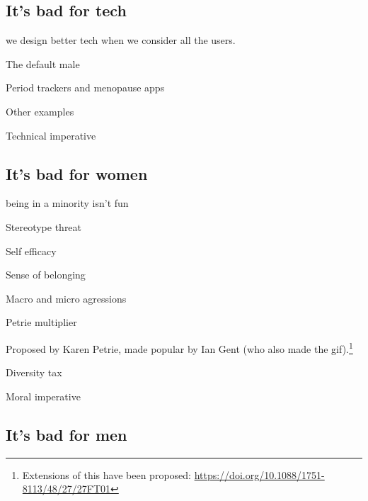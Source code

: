 \documentclass[xcolor=table]{beamer}
\begin{document}
\subsection{It's bad for tech}
\begin{frame}{we design better tech when we consider all the users. }

\end{frame}
\begin{frame}{The default male}
\end{frame}
\begin{frame}{Period trackers and menopause apps}
\end{frame}
\begin{frame}{Other examples}
\end{frame}
\begin{frame}{Technical imperative}
\end{frame}

\subsection{It's bad for women}
\begin{frame}{being in a minority isn't fun }

\end{frame}
\begin{frame}{Stereotype threat}
\end{frame}
\begin{frame}{Self efficacy}
\end{frame}
\begin{frame}{Sense of belonging }
\end{frame}
\begin{frame}{Macro and micro agressions}
\end{frame}
\begin{frame}{Petrie multiplier}
	\transduration<0-71>{0}
				
			Proposed by Karen Petrie, made popular by Ian Gent (who also made the gif).\footnote{Extensions of this have been proposed: \url{https://doi.org/10.1088/1751-8113/48/27/27FT01}}
\end{frame}
\begin{frame}{Diversity tax}
\end{frame}

\begin{frame}{Moral imperative}
\end{frame}
\subsection{It's bad for men}
\end{document}
